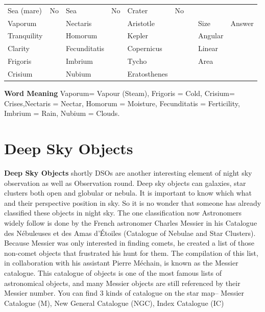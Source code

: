 \documentclass[a4paper,12pt]{extarticle}
\begin{document}
\begin{table}[H]
	\centering
	\begin{tabular}{|l|l|l|l|l|l|lll}
		\cline{1-6}
		Sea (mare)        & No\quad & Sea       & No\quad & Crater       & No &                       &                              &                            \\ \cline{1-6} \cline{8-9} 
		Vaporum      &    & Nectaris    &    & Aristotle    &    & \multicolumn{1}{l|}{} & \multicolumn{1}{l|}{Size}    & \multicolumn{1}{l|}{Answer} \\ \cline{1-6} \cline{8-9} 
		Tranquility &    & Homorum  &    & Kepler       &    & \multicolumn{1}{l|}{} & \multicolumn{1}{l|}{Angular} & \multicolumn{1}{l|}{}      \\ \cline{1-6} \cline{8-9} 
		Clarity     &    & Fecunditatis &    & Copernicus   &    & \multicolumn{1}{l|}{} & \multicolumn{1}{l|}{Linear}  & \multicolumn{1}{l|}{}      \\ \cline{1-6} \cline{8-9} 
		Frigoris        &    & Imbrium    &    & Tycho        &    & \multicolumn{1}{l|}{} & \multicolumn{1}{l|}{Area}    & \multicolumn{1}{l|}{}      \\ \cline{1-6} \cline{8-9} 
		Crisium      &    & Nubium    &    & Eratosthenes &    &                       &                              &                            \\ \cline{1-6}
	\end{tabular}
\end{table}

\textbf{Word Meaning} Vaporum= Vapour (Steam), Frigoris = Cold, Crisium= Crises,Nectaris = Nectar, Homorum = Moisture, Fecunditatis = Ferticility, Imbrium = Rain, Nubium = Clouds. 

\clearpage 
\section{Deep Sky Objects}

\textbf{Deep Sky Objects} shortly DSOs are another interesting element of night sky observation as well as Observation round. Deep sky objects can galaxies, star clusters both open and globular or nebula. It is important to know which what and their perspective position in sky. So it is no wonder that someone has already classified these objects in night sky. The one classification now Astronomers widely follow is done by the French astronomer Charles Messier in his Catalogue des Nébuleuses et des Amas d'Étoiles (Catalogue of Nebulae and Star Clusters). Because Messier was only interested in finding comets, he created a list of those non-comet objects that frustrated his hunt for them. The compilation of this list, in collaboration with his assistant Pierre Méchain, is known as the Messier catalogue. This catalogue of objects is one of the most famous lists of astronomical objects, and many Messier objects are still referenced by their Messier number. You can find 3 kinds of catalogue  on the star map-- Messier Catalogue (M), New General Catalogue (NGC), Index Catalogue (IC)\\
\end{document}
